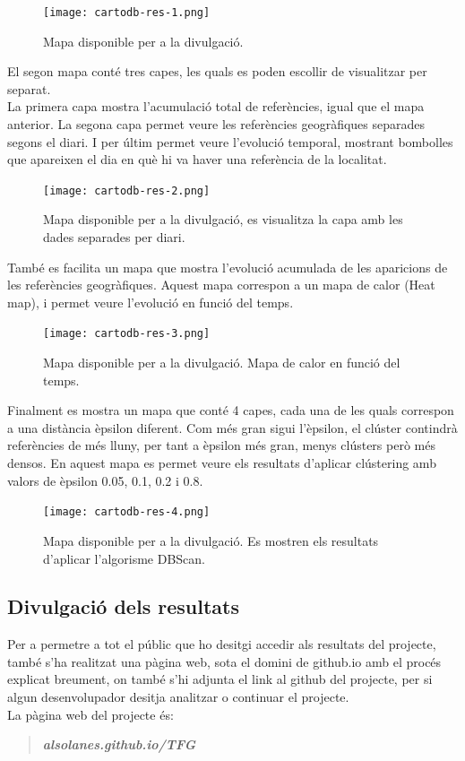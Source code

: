 \documentclass[12pt,a4paper,openright,oneside]{article}
\numberwithin{equation}{section}
\theoremstyle{definition}
\begin{document}
\begin{figure}[!htbp]
\centering
\texttt{[image: cartodb-res-1.png]}
\caption{Mapa disponible per a la divulgació.}
\end{figure}

El segon mapa conté tres capes, les quals es poden escollir de visualitzar per separat.\\
La primera capa mostra l'acumulació total de referències, igual que el mapa anterior. La segona capa permet veure les referències geogràfiques separades segons el diari. I per últim permet veure l'evolució temporal, mostrant bombolles que apareixen el dia en què hi va haver una referència de la localitat.

\begin{figure}[!htbp]
\centering
\texttt{[image: cartodb-res-2.png]}
\caption{Mapa disponible per a la divulgació, es visualitza la capa amb les dades separades per diari.}
\end{figure}

També es facilita un mapa que mostra l'evolució acumulada de les aparicions de les referències geogràfiques. Aquest mapa correspon a un mapa de calor (Heat map), i permet veure l'evolució en funció del temps.

\begin{figure}[!htbp]
\centering
\texttt{[image: cartodb-res-3.png]}
\caption{Mapa disponible per a la divulgació. Mapa de calor en funció del temps.}
\end{figure}

Finalment es mostra un mapa que conté 4 capes, cada una de les quals correspon a una distància èpsilon diferent. Com més gran sigui l'èpsilon, el clúster contindrà referències de més lluny, per tant a èpsilon més gran, menys clústers però més densos. En aquest mapa es permet veure els resultats d'aplicar clústering amb valors de èpsilon 0.05, 0.1, 0.2 i 0.8.
\begin{figure}[!htbp]
\centering
\texttt{[image: cartodb-res-4.png]}
\caption{Mapa disponible per a la divulgació. Es mostren els resultats d'aplicar l'algorisme DBScan.}
\end{figure}
\newpage
\subsection{Divulgació dels resultats}
Per a permetre a tot el públic que ho desitgi accedir als resultats del projecte, també s'ha realitzat una pàgina web, sota el domini de github.io amb el procés explicat breument, on també s'hi adjunta el link al github del projecte, per si algun desenvolupador desitja analitzar o continuar el projecte.\\
La pàgina web del projecte és:
\begin{quote}
\centering
\textbf{\textit{alsolanes.github.io/TFG}}
\end{quote}
\end{document}
